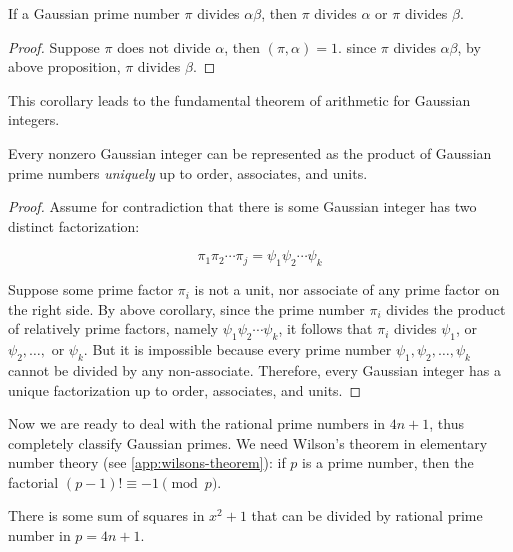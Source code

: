 \documentclass[b5paper]{article}
\begin{document}
\begin{corollary}\label{thm:Gaussian-primary}
If a Gaussian prime number $\pi$ divides $\alpha \beta$, then $\pi$ divides $\alpha$ or $\pi$ divides $\beta$.
\end{corollary}

\begin{proof}
Suppose $\pi$ does not divide $\alpha$, then $(\pi, \alpha) = 1$. since $\pi$ divides $\alpha \beta$, by above proposition, $\pi$ divides $\beta$.
\end{proof}

This corollary leads to the fundamental theorem of arithmetic for Gaussian integers.

\begin{theorem}
Every nonzero Gaussian integer can be represented as the product of Gaussian prime numbers \emph{uniquely} up to order, associates, and units.
\end{theorem}

\begin{proof}
Assume for contradiction that there is some Gaussian integer has two distinct factorization:

\[
\pi_1 \pi_2 \dotsm \pi_j = \psi_1 \psi_2 \dotsm \psi_k
\]

Suppose some prime factor $\pi_i$ is not a unit, nor associate of any prime factor on the right side. By above corollary, since the prime number $\pi_i$ divides the product of relatively prime factors, namely $\psi_1 \psi_2 \dotsm \psi_k$, it follows that $\pi_i$ divides $\psi_1$, or $\psi_2, \dotsc, $ or $\psi_k$. But it is impossible because every prime number $\psi_1, \psi_2, \dotsc, \psi_k$ cannot be divided by any non-associate. Therefore, every Gaussian integer has a unique factorization up to order, associates, and units.
\end{proof}

Now we are ready to deal with the rational prime numbers in $4n + 1$, thus completely classify Gaussian primes. We need Wilson's theorem in elementary number theory (see \cref{app:wilsons-theorem}): if $p$ is a prime number, then the factorial $(p - 1)! \equiv -1 \pmod p$.

\begin{lemma}
There is some sum of squares in $x^2 + 1$ that can be divided by rational prime number in $p = 4n + 1$.
\end{lemma}
\end{document}

